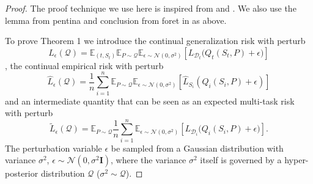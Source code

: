 \documentclass[letterpaper]{article} %
\begin{document}
\begin{proof}

The proof technique we use here is inspired from \cite{pentinaPACBayesianBoundLifelong2014} and \cite{foretSharpnessAwareMinimizationEfficiently2021}. We also use the lemma from pentina  and conclusion from foret  in as above. 





To prove Theorem 1 we introduce the continual generalization risk with perturb 
$$L_{\epsilon}(\mathcal{Q}) = \mathbb{E}_{(t,S_t)} \mathbb{E}_{P \sim \mathcal{Q}} \mathbb{E}_{\epsilon \sim \mathcal{N}(0, \sigma^2)} \left[ L_{\mathcal{D}_t}\big(Q_t(S_t, P) + \epsilon\big) \right]$$, the  continual empirical risk with  perturb 
$$\hat{L}_{\epsilon}(\mathcal{Q})= \frac{1}{n} \sum_{i=1}^n \mathbb{E}_{P \sim \mathcal{Q}} \mathbb{E}_{\epsilon \sim \mathcal{N}(0, \sigma^2)}  [\hat{L}_{S_i}(Q_i(S_i,P)+\epsilon)]$$
and an intermediate quantity that can be seen as an expected multi-task risk with perturb 
$$\tilde{L}_\epsilon(\mathcal{Q}) = \mathbb{E}_{P \sim \mathcal{Q}} \frac{1}{n} \sum_{i=1}^n \mathbb{E}_{\epsilon \sim \mathcal{N}(0, \sigma^2)} \left[ L_{\mathcal{D}_i}\big(Q_i(S_i, P) + \epsilon\big) \right].$$
The perturbation variable $\epsilon$ be sampled from a Gaussian distribution with variance $\sigma^2$,  $\epsilon \sim \mathcal{N}(0, \sigma^2\mathbf{I})$, where the variance $\sigma^2$ itself is governed by a hyper-posterior distribution $\mathcal{Q}$ ($\sigma^2 \sim \mathcal{Q}$). 


\end{proof}
\end{document}
